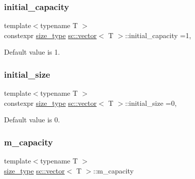 \mbox{\label{classsc_1_1vector_af204bbfa1577f385dba49a08c8edae7c}} 
\subsubsection{\texorpdfstring{initial\+\_\+capacity}{initial\_capacity}}
{\footnotesize\ttfamily template$<$typename T $>$ \\
constexpr \hyperlink{classsc_1_1vector_aa4500ebad5be45f8d469fc4b5d62b19d}{size\+\_\+type} \hyperlink{classsc_1_1vector}{sc\+::vector}$<$ T $>$\+::initial\+\_\+capacity =1\hspace{0.3cm}{\ttfamily [static]}, {\ttfamily [private]}}



Default value is 1. 

\mbox{\label{classsc_1_1vector_ae72361ba48d0f8b5f75140afaa71e9c6}} 
\subsubsection{\texorpdfstring{initial\+\_\+size}{initial\_size}}
{\footnotesize\ttfamily template$<$typename T $>$ \\
constexpr \hyperlink{classsc_1_1vector_aa4500ebad5be45f8d469fc4b5d62b19d}{size\+\_\+type} \hyperlink{classsc_1_1vector}{sc\+::vector}$<$ T $>$\+::initial\+\_\+size =0\hspace{0.3cm}{\ttfamily [static]}, {\ttfamily [private]}}



Default value is 0. 

\mbox{\label{classsc_1_1vector_a566372683113653e90132001ddec8baa}} 
\subsubsection{\texorpdfstring{m\+\_\+capacity}{m\_capacity}}
{\footnotesize\ttfamily template$<$typename T $>$ \\
\hyperlink{classsc_1_1vector_aa4500ebad5be45f8d469fc4b5d62b19d}{size\+\_\+type} \hyperlink{classsc_1_1vector}{sc\+::vector}$<$ T $>$\+::m\+\_\+capacity\hspace{0.3cm}{\ttfamily [private]}}



